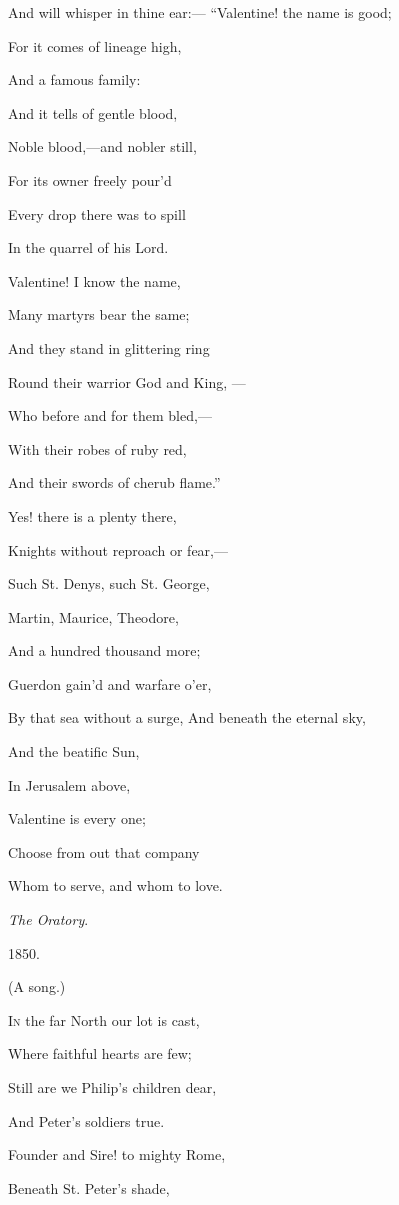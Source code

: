 And will whisper in thine ear:— ``Valentine! the name is good;

For it comes of lineage high,

And a famous family:

And it tells of gentle blood,

Noble blood,—and nobler still,

For its owner freely pour'd

Every drop there was to spill

In the quarrel of his Lord.

Valentine! I know the name,

Many martyrs bear the same;

And they stand in glittering ring

Round their warrior God and King, —

Who before and for them bled,—

With their robes of ruby red,

And their swords of cherub flame.''

Yes! there is a plenty there,

Knights without reproach or fear,—

Such St. Denys, such St. George,

Martin, Maurice, Theodore,

And a hundred thousand more;

Guerdon gain'd and warfare o'er,

By that sea without a surge, And beneath the eternal sky,

And the beatific Sun,

In Jerusalem above,

Valentine is every one;

Choose from out that company

Whom to serve, and whom to love.

\emph{The Oratory}.

1850.


(A song.)

I\textsc{n} the far North our lot is cast,

Where faithful hearts are few;

Still are we Philip's children dear,

And Peter's soldiers true.

Founder and Sire! to mighty Rome,

Beneath St. Peter's shade,


